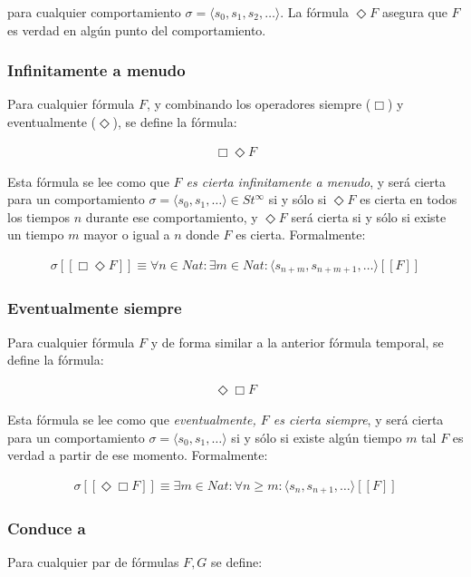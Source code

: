 para cualquier comportamiento $\sigma = \langle s_0, s_1, s_2, \ldots \rangle$. La fórmula $\Diamond F$ asegura que $F$ es verdad en algún punto del comportamiento.

\subsubsection{Infinitamente a menudo}
Para cualquier fórmula $F$, y combinando los operadores siempre ($\Box$) y eventualmente ($\Diamond$), se define la fórmula:

\begin{align}
\Box \Diamond F
\end{align}

Esta fórmula se lee como que \textit{$F$ es cierta infinitamente a menudo}, y será cierta para un comportamiento $\sigma = \langle s_0, s_1, \ldots \rangle \in St^\infty$ si y sólo si $\Diamond F$ es cierta en todos los tiempos $n$ durante ese comportamiento, y $\Diamond F$ será cierta si y sólo si existe un tiempo $m$ mayor o igual a $n$ donde $F$ es cierta. Formalmente:

\begin{align}
\sigma [[\Box \Diamond F]] \equiv \forall n \in Nat : \exists m \in Nat : \langle s_{n+m}, s_{n+m+1},\ldots \rangle [[F]]
\end{align}

\subsubsection{Eventualmente siempre}
Para cualquier fórmula $F$ y de forma similar a la anterior fórmula temporal, se define la fórmula:

\begin{align}
\Diamond \Box F
\end{align}

Esta fórmula se lee como que \textit{eventualmente, $F$ es cierta siempre}, y será cierta para un comportamiento $\sigma = \langle s_0, s_1, \ldots \rangle$ si y sólo si existe algún tiempo $m$ tal $F$ es verdad a partir de ese momento. Formalmente:

\begin{align}
\sigma [[\Diamond \Box F]] \equiv \exists m \in Nat : \forall n \geq m : \langle s_{n}, s_{n+1}, \ldots \rangle [[F]]
\end{align}

\subsubsection{Conduce a}
\noindent
Para cualquier par de fórmulas $F,G$ se define:

